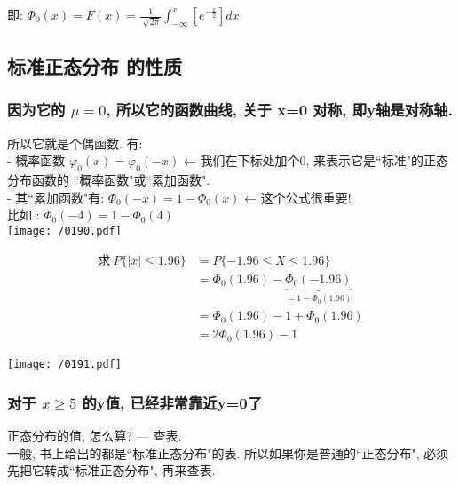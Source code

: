 \documentclass[UTF8]{ctexart}
\begin{document}
即: $\boxed{
	\varPhi _0(x)=F\left( x \right) =\frac{1}{\sqrt[]{2\pi}}\int_{-\infty}^x{\left[ e^{-\frac{x}{2}} \right]}dx
}$





\vspace{1em} 
\subsection{标准正态分布 的性质}

\subsubsection{因为它的 $\mu=0$, 所以它的函数曲线, 关于 x=0 对称, 即y轴是对称轴.}

所以它就是个偶函数.  有: \\
- 概率函数 $ \varphi_0(x) = \varphi_0(-x) $   ← 我们在下标处加个0, 来表示它是``标准"的正态分布函数的 ``概率函数"或``累加函数". \\

- 其``累加函数"有: $\boxed{\varPhi _0(-x)=1-\varPhi _0(x)}$ ← 这个公式很重要! \\
比如 : $\varPhi _0(-4)=1-\varPhi _0(4)$ \\

\texttt{[image: /0190.pdf]} \\
	
	
\begin{myEnvSample}
	\begin{align*}  %
	\text{求} \ P\{|x|\leq 1.96\} &=P\{-1.96\leq X\leq 1.96\}\\
&=\varPhi _0(1.96)-\underset{=1-\varPhi _0(1.96)}{\underbrace{\varPhi _0(-1.96)}}\\
&=\varPhi _0(1.96)-1+\varPhi _0(1.96)\\
&=2\varPhi _0(1.96)-1
	\end{align*}

\texttt{[image: /0191.pdf]} 
\end{myEnvSample}	






\subsubsection{对于 $ x \geq 5$ 的y值, 已经非常靠近y=0了}

正态分布的值, 怎么算? --- 查表. \\
一般, 书上给出的都是``标准正态分布"的表. 所以如果你是普通的``正态分布", 必须先把它转成``标准正态分布", 再来查表. \\
\end{document}
